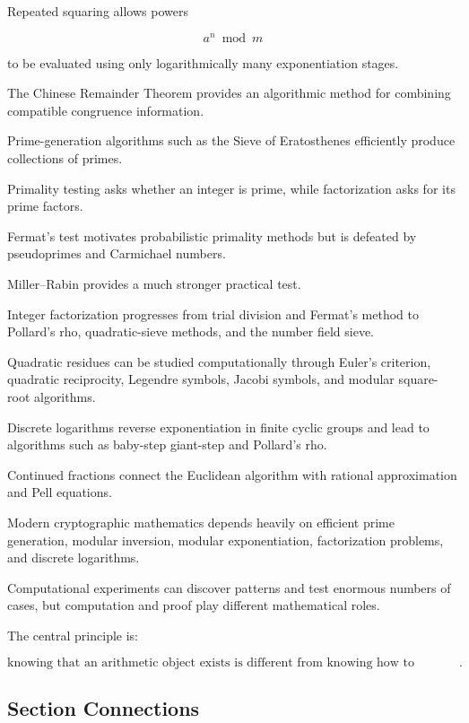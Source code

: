 Repeated squaring allows powers

\[ a^n\bmod m \]

to be evaluated using only logarithmically many exponentiation stages.

The Chinese Remainder Theorem provides an algorithmic method for combining
compatible congruence information.

Prime-generation algorithms such as the Sieve of Eratosthenes efficiently
produce collections of primes.

Primality testing asks whether an integer is prime, while factorization asks
for its prime factors.

Fermat's test motivates probabilistic primality methods but is defeated by
pseudoprimes and Carmichael numbers.

Miller--Rabin provides a much stronger practical test.

Integer factorization progresses from trial division and Fermat's method to
Pollard's rho, quadratic-sieve methods, and the number field sieve.

Quadratic residues can be studied computationally through Euler's criterion,
quadratic reciprocity, Legendre symbols, Jacobi symbols, and modular
square-root algorithms.

Discrete logarithms reverse exponentiation in finite cyclic groups and lead
to algorithms such as baby-step giant-step and Pollard's rho.

Continued fractions connect the Euclidean algorithm with rational
approximation and Pell equations.

Modern cryptographic mathematics depends heavily on efficient prime
generation, modular inversion, modular exponentiation, factorization
problems, and discrete logarithms.

Computational experiments can discover patterns and test enormous numbers of
cases, but computation and proof play different mathematical roles.

The central principle is:

\[
\boxed{
\text{knowing that an arithmetic object exists is different from knowing how
to compute it efficiently}.
}
\]

\subsection{Section Connections}
\label{subsec:computational-number-theory-connections}

